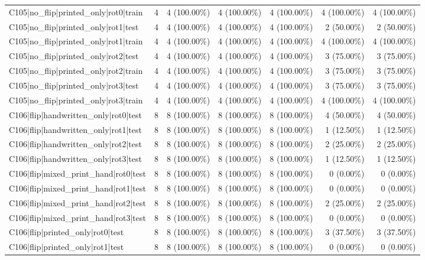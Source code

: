\begin{longtable}{>{\raggedright\arraybackslash}p{5cm}rrrrrr}
C105|no\_flip|printed\_only|rot0|train & 4 & 4 (100.00\%) & 4 (100.00\%) & 4 (100.00\%) & 4 (100.00\%) & 4 (100.00\%) \\
C105|no\_flip|printed\_only|rot1|test & 4 & 4 (100.00\%) & 4 (100.00\%) & 4 (100.00\%) & 2 (50.00\%) & 2 (50.00\%) \\
C105|no\_flip|printed\_only|rot1|train & 4 & 4 (100.00\%) & 4 (100.00\%) & 4 (100.00\%) & 4 (100.00\%) & 4 (100.00\%) \\
C105|no\_flip|printed\_only|rot2|test & 4 & 4 (100.00\%) & 4 (100.00\%) & 4 (100.00\%) & 3 (75.00\%) & 3 (75.00\%) \\
C105|no\_flip|printed\_only|rot2|train & 4 & 4 (100.00\%) & 4 (100.00\%) & 4 (100.00\%) & 3 (75.00\%) & 3 (75.00\%) \\
C105|no\_flip|printed\_only|rot3|test & 4 & 4 (100.00\%) & 4 (100.00\%) & 4 (100.00\%) & 3 (75.00\%) & 3 (75.00\%) \\
C105|no\_flip|printed\_only|rot3|train & 4 & 4 (100.00\%) & 4 (100.00\%) & 4 (100.00\%) & 4 (100.00\%) & 4 (100.00\%) \\
C106|flip|handwritten\_only|rot0|test & 8 & 8 (100.00\%) & 8 (100.00\%) & 8 (100.00\%) & 4 (50.00\%) & 4 (50.00\%) \\
C106|flip|handwritten\_only|rot1|test & 8 & 8 (100.00\%) & 8 (100.00\%) & 8 (100.00\%) & 1 (12.50\%) & 1 (12.50\%) \\
C106|flip|handwritten\_only|rot2|test & 8 & 8 (100.00\%) & 8 (100.00\%) & 8 (100.00\%) & 2 (25.00\%) & 2 (25.00\%) \\
C106|flip|handwritten\_only|rot3|test & 8 & 8 (100.00\%) & 8 (100.00\%) & 8 (100.00\%) & 1 (12.50\%) & 1 (12.50\%) \\
C106|flip|mixed\_print\_hand|rot0|test & 8 & 8 (100.00\%) & 8 (100.00\%) & 8 (100.00\%) & 0 (0.00\%) & 0 (0.00\%) \\
C106|flip|mixed\_print\_hand|rot1|test & 8 & 8 (100.00\%) & 8 (100.00\%) & 8 (100.00\%) & 0 (0.00\%) & 0 (0.00\%) \\
C106|flip|mixed\_print\_hand|rot2|test & 8 & 8 (100.00\%) & 8 (100.00\%) & 8 (100.00\%) & 2 (25.00\%) & 2 (25.00\%) \\
C106|flip|mixed\_print\_hand|rot3|test & 8 & 8 (100.00\%) & 8 (100.00\%) & 8 (100.00\%) & 0 (0.00\%) & 0 (0.00\%) \\
C106|flip|printed\_only|rot0|test & 8 & 8 (100.00\%) & 8 (100.00\%) & 8 (100.00\%) & 3 (37.50\%) & 3 (37.50\%) \\
C106|flip|printed\_only|rot1|test & 8 & 8 (100.00\%) & 8 (100.00\%) & 8 (100.00\%) & 0 (0.00\%) & 0 (0.00\%) \\

\end{longtable}

